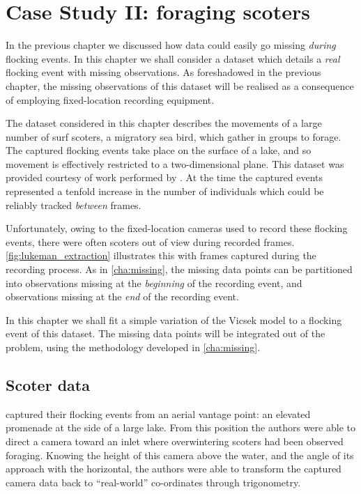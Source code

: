 \graphicspath{{fig/scoters/}}

\chapter{Case Study II: foraging scoters}
\label{cha:scoters}

In the previous chapter we discussed how data could easily go missing
\emph{during} flocking events. In this chapter we shall consider a dataset
which details a \emph{real} flocking event with missing observations. As
foreshadowed in the previous chapter, the missing observations of this dataset
will be realised as a consequence of employing fixed-location recording
equipment.

The dataset considered in this chapter describes the movements of a large
number of surf scoters, a migratory sea bird, which gather in groups to forage.
The captured flocking events take place on the surface of a lake, and so
movement is effectively restricted to a two-dimensional plane. This dataset was
provided courtesy of work performed by \textcite{lukeman09,lukeman10}. At the
time the captured events represented a tenfold increase in the number of
individuals which could be reliably tracked \emph{between} frames.

Unfortunately, owing to the fixed-location cameras used to record these
flocking events, there were often scoters out of view during recorded frames.
\cref{fig:lukeman_extraction} illustrates this with frames captured during the
recording process. As in \cref{cha:missing}, the missing data points can be
partitioned into observations missing at the \emph{beginning} of the recording
event, and observations missing at the \emph{end} of the recording event.

In this chapter we shall fit a simple variation of the Vicsek model to a
flocking event of this dataset. The missing data points will be integrated out
of the problem, using the methodology developed in \cref{cha:missing}.

\section{Scoter data}

\textcite{lukeman10} captured their flocking events from an aerial vantage
point: an elevated promenade at the side of a large lake. From this position
the authors were able to direct a camera toward an inlet where overwintering
scoters had been observed foraging. Knowing the height of this camera above the
water, and the angle of its approach with the horizontal, the authors were able
to transform the captured camera data back to ``real-world'' co-ordinates
through trigonometry.

